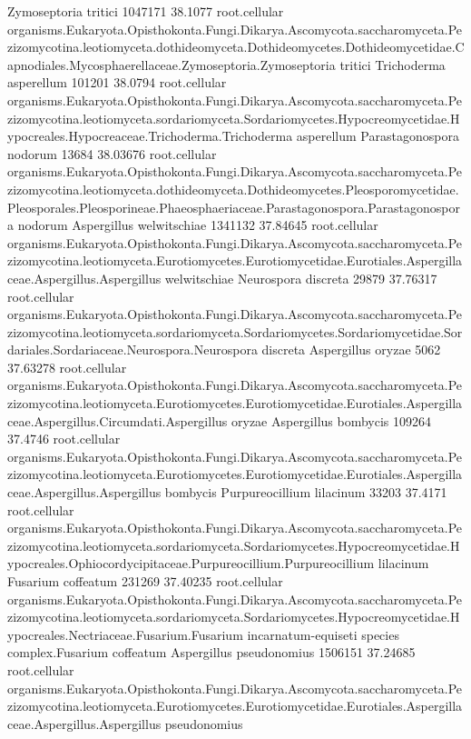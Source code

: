\documentclass{article}
\begin{document}
\begin{Schunk}
\begin{Soutput}
 Zymoseptoria tritici 		 1047171 38.1077 	 root.cellular organisms.Eukaryota.Opisthokonta.Fungi.Dikarya.Ascomycota.saccharomyceta.Pezizomycotina.leotiomyceta.dothideomyceta.Dothideomycetes.Dothideomycetidae.Capnodiales.Mycosphaerellaceae.Zymoseptoria.Zymoseptoria tritici
 Trichoderma asperellum 		 101201 38.0794 	 root.cellular organisms.Eukaryota.Opisthokonta.Fungi.Dikarya.Ascomycota.saccharomyceta.Pezizomycotina.leotiomyceta.sordariomyceta.Sordariomycetes.Hypocreomycetidae.Hypocreales.Hypocreaceae.Trichoderma.Trichoderma asperellum
 Parastagonospora nodorum 		 13684 38.03676 	 root.cellular organisms.Eukaryota.Opisthokonta.Fungi.Dikarya.Ascomycota.saccharomyceta.Pezizomycotina.leotiomyceta.dothideomyceta.Dothideomycetes.Pleosporomycetidae.Pleosporales.Pleosporineae.Phaeosphaeriaceae.Parastagonospora.Parastagonospora nodorum
 Aspergillus welwitschiae 		 1341132 37.84645 	 root.cellular organisms.Eukaryota.Opisthokonta.Fungi.Dikarya.Ascomycota.saccharomyceta.Pezizomycotina.leotiomyceta.Eurotiomycetes.Eurotiomycetidae.Eurotiales.Aspergillaceae.Aspergillus.Aspergillus welwitschiae
 Neurospora discreta 		 29879 37.76317 	 root.cellular organisms.Eukaryota.Opisthokonta.Fungi.Dikarya.Ascomycota.saccharomyceta.Pezizomycotina.leotiomyceta.sordariomyceta.Sordariomycetes.Sordariomycetidae.Sordariales.Sordariaceae.Neurospora.Neurospora discreta
 Aspergillus oryzae 		 5062 37.63278 	 root.cellular organisms.Eukaryota.Opisthokonta.Fungi.Dikarya.Ascomycota.saccharomyceta.Pezizomycotina.leotiomyceta.Eurotiomycetes.Eurotiomycetidae.Eurotiales.Aspergillaceae.Aspergillus.Circumdati.Aspergillus oryzae
 Aspergillus bombycis 		 109264 37.4746 	 root.cellular organisms.Eukaryota.Opisthokonta.Fungi.Dikarya.Ascomycota.saccharomyceta.Pezizomycotina.leotiomyceta.Eurotiomycetes.Eurotiomycetidae.Eurotiales.Aspergillaceae.Aspergillus.Aspergillus bombycis
 Purpureocillium lilacinum 		 33203 37.4171 	 root.cellular organisms.Eukaryota.Opisthokonta.Fungi.Dikarya.Ascomycota.saccharomyceta.Pezizomycotina.leotiomyceta.sordariomyceta.Sordariomycetes.Hypocreomycetidae.Hypocreales.Ophiocordycipitaceae.Purpureocillium.Purpureocillium lilacinum
 Fusarium coffeatum 		 231269 37.40235 	 root.cellular organisms.Eukaryota.Opisthokonta.Fungi.Dikarya.Ascomycota.saccharomyceta.Pezizomycotina.leotiomyceta.sordariomyceta.Sordariomycetes.Hypocreomycetidae.Hypocreales.Nectriaceae.Fusarium.Fusarium incarnatum-equiseti species complex.Fusarium coffeatum
 Aspergillus pseudonomius 		 1506151 37.24685 	 root.cellular organisms.Eukaryota.Opisthokonta.Fungi.Dikarya.Ascomycota.saccharomyceta.Pezizomycotina.leotiomyceta.Eurotiomycetes.Eurotiomycetidae.Eurotiales.Aspergillaceae.Aspergillus.Aspergillus pseudonomius

\end{Soutput}
\end{Schunk}
\end{document}

